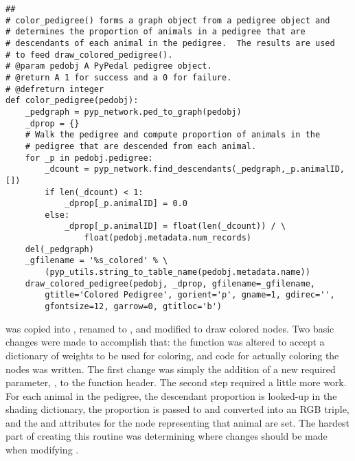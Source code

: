 \begin{verbatim}
##
# color_pedigree() forms a graph object from a pedigree object and
# determines the proportion of animals in a pedigree that are
# descendants of each animal in the pedigree.  The results are used
# to feed draw_colored_pedigree().
# @param pedobj A PyPedal pedigree object.
# @return A 1 for success and a 0 for failure.
# @defreturn integer
def color_pedigree(pedobj):
    _pedgraph = pyp_network.ped_to_graph(pedobj)
    _dprop = {}
    # Walk the pedigree and compute proportion of animals in the
    # pedigree that are descended from each animal.
    for _p in pedobj.pedigree:
        _dcount = pyp_network.find_descendants(_pedgraph,_p.animalID,[])
        if len(_dcount) < 1:
            _dprop[_p.animalID] = 0.0
        else:
            _dprop[_p.animalID] = float(len(_dcount)) / \
                float(pedobj.metadata.num_records)
    del(_pedgraph)
    _gfilename = '%s_colored' % \
        (pyp_utils.string_to_table_name(pedobj.metadata.name))
    draw_colored_pedigree(pedobj, _dprop, gfilename=_gfilename,
        gtitle='Colored Pedigree', gorient='p', gname=1, gdirec='',
        gfontsize=12, garrow=0, gtitloc='b')
\end{verbatim}
 was copied into , renamed to , and modified to draw colored nodes.  Two basic changes were made to accomplish that: the function was altered to accept a dictionary of weights to be used for coloring, and code for actually coloring the nodes was written.  The first change was simply the addition of a new required parameter, , to the function header.  The second step required a little more work.  For each animal in the pedigree, the descendant proportion is looked-up in the shading dictionary, the proportion is passed to  and converted into an RGB triple, and the  and  attributes for the node representing that animal are set.  The hardest part of creating this routine was determining where changes should be made when modifying .
